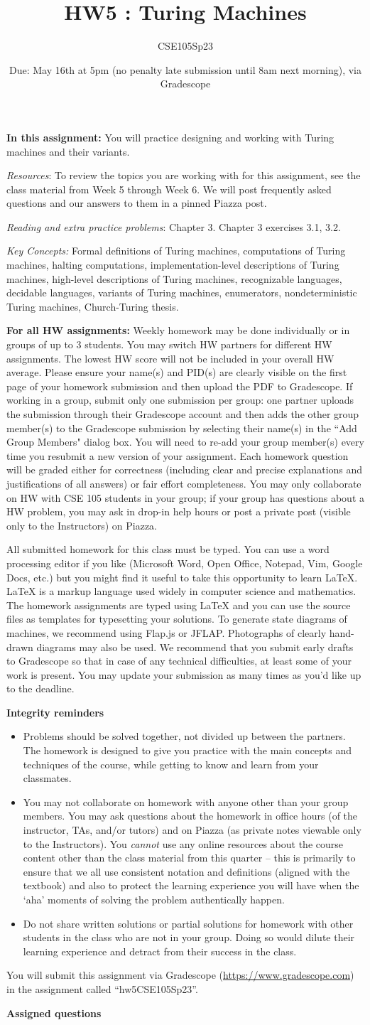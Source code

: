 \documentclass[12pt, oneside]{article}
\author{CSE105Sp23}
\title{HW5 : Turing Machines}
\date{Due: May 16th at 5pm (no penalty late submission until 8am next morning), via Gradescope}
\newcommand{\instructions}{{\bf For all HW assignments:} Weekly homework 
may be done individually or in groups of up to 3 students. 
You may switch HW partners for different HW assignments. 
The lowest HW score will not be included in your overall HW average. 
Please ensure your name(s) and PID(s) are clearly visible on the first page of your homework submission 
and then upload the PDF to Gradescope. If working in a group, submit only one submission per group: 
one partner uploads the submission through their Gradescope account and then adds the other group member(s) 
to the Gradescope submission by selecting their name(s) in the ``Add Group Members" dialog box. 
You will need to re-add your group member(s) every time you resubmit a new version of your assignment.
 Each homework question will be graded either for correctness (including clear and precise explanations and 
 justifications of all answers) or fair effort completeness. You may only collaborate on HW with CSE 105 students 
 in your group; if your group has questions about a HW problem, you may ask in drop-in help hours or post a private 
 post (visible only to the Instructors) on Piazza.

All submitted homework for this class must be typed. 
You can use a word processing editor if you like (Microsoft Word, Open Office, Notepad, Vim, Google Docs, etc.) 
but you might find it useful to take this opportunity to learn LaTeX. 
LaTeX is a markup language used widely in computer science and mathematics. 
The homework assignments are typed using LaTeX and you can use the source files 
as templates for typesetting your solutions.
To generate state diagrams of machines, we recommend using Flap.js
or JFLAP. Photographs of clearly hand-drawn diagrams may also be used. We recommend that you
submit early drafts to Gradescope so that in case of any technical difficulties, at least some of your
work is present. You may update your submission as many times as you'd like up to the deadline.


{\bf Integrity reminders}
\begin{itemize}
\item Problems should be solved together, not divided up between the partners. The homework is
designed to give you practice with the main concepts and techniques of the course, 
while getting to know and learn from your classmates.
\item You may not collaborate on homework with anyone other than your group members.
You may ask questions about the homework in office hours (of the instructor, TAs, and/or tutors) and 
on Piazza (as private notes viewable only to the Instructors).  
You \emph{cannot} use any online resources about the course content other than the class material 
from this quarter -- this is primarily to ensure that we all use consistent notation and
definitions (aligned with the textbook) and also to protect the learning experience you will have when
the `aha' moments of solving the problem authentically happen.
\item Do not share written solutions or partial solutions for homework with 
other students in the class who are not in your group. Doing so would dilute their learning 
experience and detract from their success in the class.
\end{itemize}

}
\begin{document}
\maketitle
\thispagestyle{fancy}

\textbf{In this assignment:} You will practice designing and working with Turing machines and their variants.

\textit{Resources}: To review the topics you are working with for this assignment, 
see the class material from Week 5 through Week 6. We will post frequently asked questions 
and our answers to them in a pinned Piazza post.

\textit{Reading and extra practice problems}: Chapter 3. Chapter 3 exercises 3.1, 3.2. 

\textit{Key Concepts:} Formal definitions of Turing machines, computations of Turing machines, 
halting computations, implementation-level descriptions of Turing machines, high-level descriptions 
of Turing machines, recognizable languages, decidable languages, variants of Turing machines, 
enumerators, nondeterministic Turing machines, Church-Turing thesis.

\instructions

You will submit this assignment via Gradescope
(\href{https://www.gradescope.com}{https://www.gradescope.com}) 
in the assignment called ``hw5CSE105Sp23''.

\textbf{Assigned questions}
\end{document}

